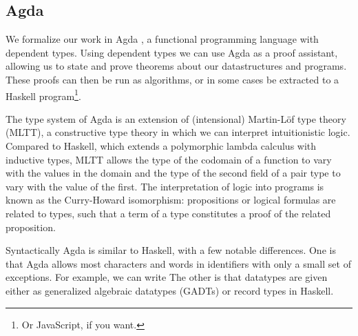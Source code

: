 \subsection{Agda}
We formalize our work in Agda \cite{agda}, a functional programming language with dependent types. Using dependent types we can use Agda as a proof assistant, allowing us to state and prove theorems about our datastructures and programs. These proofs can then be run as algorithms, or in some cases be extracted to a Haskell program\footnote{Or JavaScript, if you want.}.

The type system of Agda is an extension of (intensional) Martin-Löf type theory (MLTT), a constructive type theory in which we can interpret intuitionistic logic. Compared to Haskell, which extends a polymorphic lambda calculus with inductive types, MLTT allows the type of the codomain of a function to vary with the values in the domain and the type of the second field of a pair type to vary with the value of the first. The interpretation of logic into programs is known as the Curry-Howard isomorphism: propositions or logical formulas are related to types, such that a term of a type constitutes a proof of the related proposition.

Syntactically Agda is similar to Haskell, with a few notable differences. One is that Agda allows most characters and words in identifiers with only a small set of exceptions. For example, we can write
The other is that datatypes are given either as generalized algebraic datatypes (GADTs) or record types in Haskell.

